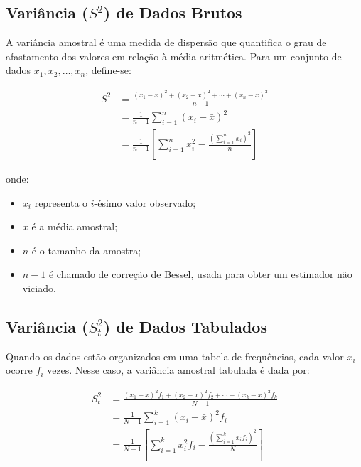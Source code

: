 \subsection{Variância ($S^{2}$) de Dados Brutos}

A variância amostral é uma medida de dispersão que quantifica o grau de afastamento
dos valores em relação à média aritmética. Para um conjunto de dados
$x_{1},x_{2},\ldots,x_{n}$, define-se:

\begin{align}
S^{2} &=
\frac{(x_{1}-\bar{x})^{2}+(x_{2}-\bar{x})^{2}+\cdots+(x_{n}-\bar{x})^{2}}{n-1}
\label{eq:var_expandida}
\\[0.4cm]
&=
\frac{1}{n-1}\sum_{i=1}^{n}(x_{i}-\bar{x})^{2}
\label{eq:var_somatorio}
\\[0.4cm]
&=
\frac{1}{n-1}
\left[
\sum_{i=1}^{n}x_{i}^{2}
-
\frac{\left(\sum_{i=1}^{n}x_{i}\right)^{2}}{n}
\right]
\label{eq:var_computacional}
\end{align}

onde:
\begin{itemize}
    \item $x_i$ representa o $i$-ésimo valor observado;
    \item $\bar{x}$ é a média amostral;
    \item $n$ é o tamanho da amostra;
    \item $n-1$ é chamado de correção de Bessel, usada para obter um estimador não viciado.
\end{itemize}


\newpage
\subsection{Variância ($S^{2}_{t}$) de Dados Tabulados}

Quando os dados estão organizados em uma tabela de frequências, cada valor
$x_i$ ocorre $f_i$ vezes. Nesse caso, a variância amostral tabulada é dada por:

\begin{align}
S_t^{2}
&=
\frac{(x_{1}-\bar{x})^{2}f_{1}+
      (x_{2}-\bar{x})^{2}f_{2}+
      \cdots+
      (x_{k}-\bar{x})^{2}f_{k}}
     {N-1}
\label{eq:var_tabulada_expandida}
\\[0.4cm]
&=
\frac{1}{N-1}\sum_{i=1}^{k}(x_{i}-\bar{x})^{2}f_{i}
\label{eq:var_tabulada_somatorio}
\\[0.4cm]
&=
\frac{1}{N-1}
\left[
\sum_{i=1}^{k}x_{i}^{2}f_{i}
-
\frac{\left(\sum_{i=1}^{k}x_{i}f_{i}\right)^{2}}{N}
\right]
\label{eq:var_tabulada_computacional}
\end{align}



